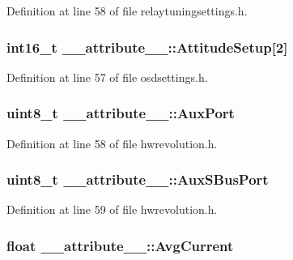 \-Definition at line 58 of file relaytuningsettings.\-h.

\hypertarget{struct____attribute_____a0c47378479e4fb316927bc0e7083a324}{
\subsubsection[{\-Attitude\-Setup}]{\setlength{\rightskip}{0pt plus 5cm}int16\-\_\-t {\bf \-\_\-\-\_\-attribute\-\_\-\-\_\-\-::\-Attitude\-Setup}\mbox{[}2\mbox{]}}}\label{struct____attribute_____a0c47378479e4fb316927bc0e7083a324}


\-Definition at line 57 of file osdsettings.\-h.

\hypertarget{struct____attribute_____a04aa2f525d11dfa7be84d46ff76e34de}{
\subsubsection[{\-Aux\-Port}]{\setlength{\rightskip}{0pt plus 5cm}uint8\-\_\-t {\bf \-\_\-\-\_\-attribute\-\_\-\-\_\-\-::\-Aux\-Port}}}\label{struct____attribute_____a04aa2f525d11dfa7be84d46ff76e34de}


\-Definition at line 58 of file hwrevolution.\-h.

\hypertarget{struct____attribute_____a85fd3a2c998f370d514da1fe0a606505}{
\subsubsection[{\-Aux\-S\-Bus\-Port}]{\setlength{\rightskip}{0pt plus 5cm}uint8\-\_\-t {\bf \-\_\-\-\_\-attribute\-\_\-\-\_\-\-::\-Aux\-S\-Bus\-Port}}}\label{struct____attribute_____a85fd3a2c998f370d514da1fe0a606505}


\-Definition at line 59 of file hwrevolution.\-h.

\hypertarget{struct____attribute_____a7a30d31dba74cf0d4f07b69b09a25090}{
\subsubsection[{\-Avg\-Current}]{\setlength{\rightskip}{0pt plus 5cm}float {\bf \-\_\-\-\_\-attribute\-\_\-\-\_\-\-::\-Avg\-Current}}}\label{struct____attribute_____a7a30d31dba74cf0d4f07b69b09a25090}


